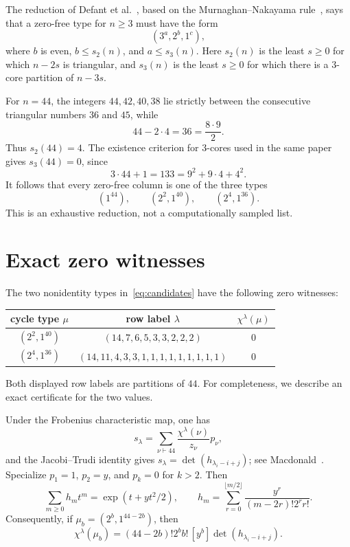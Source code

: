 \documentclass[11pt]{article}
\begin{document}
The reduction of Defant et al.~\cite[Proposition~3.1 and
Corollaries~4.1--4.2]{DefantEtAl2026}, based on the
Murnaghan--Nakayama rule~\cite{Murnaghan1937,Nakayama1940}, says that a
zero-free type for $n\ge3$ must have the form
\[
                    (3^a,2^b,1^c),
\]
where $b$ is even, $b\le s_2(n)$, and $a\le s_3(n)$.  Here $s_2(n)$ is the
least $s\ge0$ for which $n-2s$ is triangular, and $s_3(n)$ is the least
$s\ge0$ for which there is a $3$-core partition of $n-3s$.

For $n=44$, the integers $44,42,40,38$ lie strictly between the consecutive
triangular numbers $36$ and $45$, while
\[
                    44-2\cdot4=36=\frac{8\cdot9}{2}.
\]
Thus $s_2(44)=4$.  The existence criterion for $3$-cores used in the same
paper gives $s_3(44)=0$, since
\[
                3\cdot44+1=133=9^2+9\cdot4+4^2.
\]
It follows that every zero-free column is one of the three types
\begin{equation}\label{eq:candidates}
       (1^{44}),\qquad (2^2,1^{40}),\qquad (2^4,1^{36}).
\end{equation}
This is an exhaustive reduction, not a computationally sampled list.

\section{Exact zero witnesses}

The two nonidentity types in~\eqref{eq:candidates} have the following zero
witnesses:
\begin{center}
\begin{tabular}{c|c|c}
cycle type $\mu$ & row label $\lambda$ & $\chi^\lambda(\mu)$\\ \hline
$(2^2,1^{40})$ & $(14,7,6,5,3,3,2,2,2)$ & $0$\\
$(2^4,1^{36})$ & $(14,11,4,3,3,1,1,1,1,1,1,1,1,1)$ & $0$
\end{tabular}
\end{center}
Both displayed row labels are partitions of $44$.  For completeness, we
describe an exact certificate for the two values.

Under the Frobenius characteristic map, one has
\[
 s_\lambda=\sum_{\nu\vdash44}\frac{\chi^\lambda(\nu)}{z_\nu}p_\nu,
\]
and the Jacobi--Trudi identity gives
$s_\lambda=\det(h_{\lambda_i-i+j})$; see
Macdonald~\cite[Chapter~I]{Macdonald1995}.  Specialize $p_1=1$, $p_2=y$,
and $p_k=0$ for $k>2$.  Then
\[
 \sum_{m\ge0}h_m t^m=\exp(t+yt^2/2),\qquad
 h_m=\sum_{r=0}^{\lfloor m/2\rfloor}
       \frac{y^r}{(m-2r)!2^r r!}.
\]
Consequently, if $\mu_b=(2^b,1^{44-2b})$, then
\begin{equation}\label{eq:coefficient}
 \chi^\lambda(\mu_b)
 =(44-2b)!2^b b!\,[y^b]\det(h_{\lambda_i-i+j}).
\end{equation}
\end{document}
